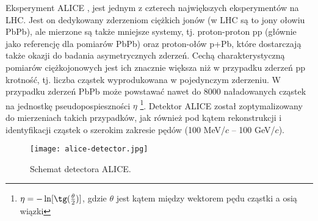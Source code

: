 Eksperyment ALICE \cite{Aamodt:2008zz}, \cite{Abelev:2014ffa} jest jednym z czterech największych eksperymentów na LHC. Jest on dedykowany zderzeniom ciężkich jonów (w LHC są to jony ołowiu PbPb), ale mierzone są także mniejsze systemy, tj. proton-proton pp (głównie jako referencję dla pomiarów PbPb) oraz proton-ołów p+Pb, które dostarczają także okazji do badania asymetrycznych zderzeń. Cechą charakterystyczną pomiarów ciężkojonowych jest ich znacznie większa niż w przypadku zderzeń pp krotność, tj. liczba cząstek wyprodukowana w pojedynczym zderzeniu. W przypadku zderzeń PbPb może powstawać nawet do 8000 naładowanych cząstek na jednostkę pseudopospieszności $\eta$  \footnote{$\eta = -\ln[\tg(\frac{\theta}{2})]$, gdzie $\theta$ jest kątem między wektorem pędu cząstki a osią wiązki}. Detektor ALICE został zoptymalizowany do mierzeniach takich przypadków, jak również pod kątem rekonstrukcji i identyfikacji cząstek o szerokim zakresie pędów (100 MeV/$c$ -- 100 GeV/$c$).


\begin{figure}[h]
	\centering
	\texttt{[image: alice-detector.jpg]}
	\caption{Schemat detectora ALICE.  }
	\label{fig:alice-detector}
\end{figure}


